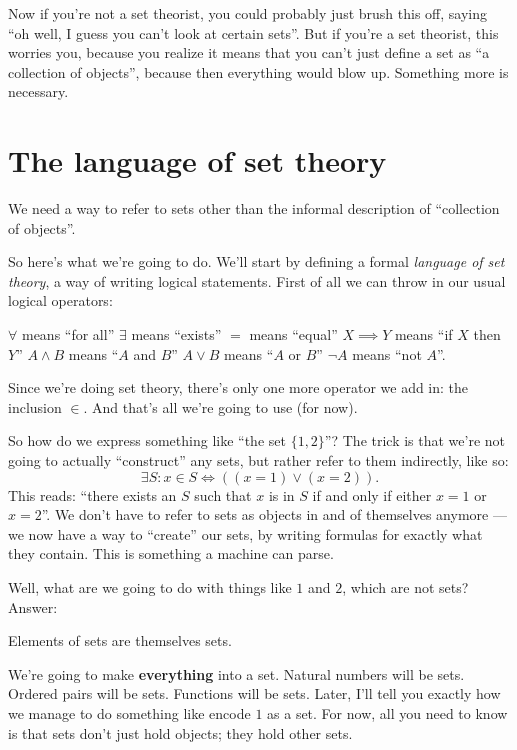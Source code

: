 Now if you're not a set theorist, you could probably just brush this off,
saying ``oh well, I guess you can't look at certain sets''.
But if you're a set theorist, this worries you,
because you realize it means that you can't
just define a set as ``a collection of objects'',
because then everything would blow up.
Something more is necessary.

\section{The language of set theory}
We need a way to refer to sets other
than the informal description of ``collection of objects''.

So here's what we're going to do.
We'll start by defining a formal \emph{language of set theory},
a way of writing logical statements.
First of all we can throw in our usual logical operators:
\begin{itemize}
	\ii $\forall$ means ``for all''
	\ii $\exists$ means ``exists''
	\ii $=$ means ``equal''
	\ii $X \implies Y$ means ``if $X$ then $Y$''
	\ii $A \land B$ means ``$A$ and $B$''
	\ii $A \lor B$ means ``$A$ or $B$''
	\ii $\neg A$ means ``not $A$''.
\end{itemize}

Since we're doing set theory,
there's only one more operator we add in: the inclusion $\in$.
And that's all we're going to use (for now).

So how do we express something like ``the set $\{1, 2\}$''?
The trick is that we're not going to actually ``construct'' any sets,
but rather refer to them indirectly, like so:
\[ \exists S : x \in S \iff \left( (x=1) \lor (x=2) \right). \]
This reads: ``there exists an $S$ such that $x$ is in $S$ if
and only if either $x=1$ or $x=2$''.
We don't have to refer to sets as objects in and of
themselves anymore --- we now have a way to ``create'' our sets,
by writing formulas for exactly what they contain.
This is something a machine can parse.

Well, what are we going to do with things like $1$ and $2$, which are not sets?
Answer:
\begin{moral}
	Elements of sets are themselves sets.
\end{moral}
We're going to make \textbf{everything} into a set.
Natural numbers will be sets. Ordered pairs will be sets. Functions will be sets.
Later, I'll tell you exactly how we manage to do something like encode $1$ as a set.
For now, all you need to know is that sets don't just hold objects;
they hold other sets.

